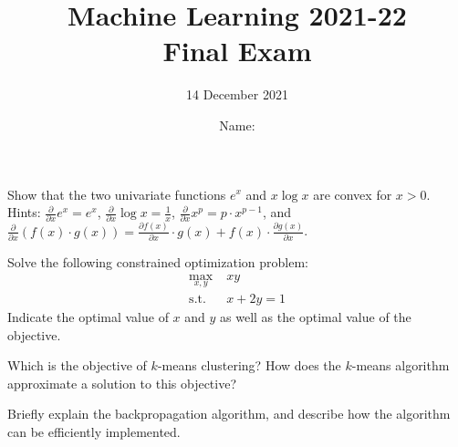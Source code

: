 \documentclass[11pt]{article}
\title{
\vspace{-1.2cm}
Machine Learning 2021-22\\ Final Exam}
\author{14 December 2021}
\date{Name: \dotfill}%
\newcounter{marks}
\begin{document}
\maketitle


\begin{list}{{\bf Question :}}
	{
	}

\item
{}
\addtocounter{marks}{2}
Show that the two univariate functions $e^x$ and $x\log x$ are convex for $x>0$.\\
Hints: $\frac \partial {\partial x} e^x = e^x$, $\frac \partial {\partial x} \log x = \frac 1 x$, $\frac \partial {\partial x} x^p = p \cdot x^{p-1}$, and $\frac \partial {\partial x} \left( f(x) \cdot g(x) \right) = \frac {\partial f(x)} {\partial x} \cdot g(x) + f(x) \cdot\frac {\partial g(x)} {\partial x}$.

\framebox[16cm][l]{ 
\parbox{15.9cm}{
\vspace*{7cm}
}}

\item
{}
\addtocounter{marks}{2}
Solve the following constrained optimization problem:
  \begin{align*}
	\max_{x,y} \; & xy\\
	\mathrm{s.t.} \; & x + 2y = 1
  \end{align*}
  Indicate the optimal value of $x$ and $y$ as well as the optimal value of the objective.

\framebox[16cm][l]{ 
\parbox{15.9cm}{
\vspace*{7cm}
}}

\pagebreak



\item
{}
\addtocounter{marks}{1}
Which is the objective of $k$-means clustering? How does the $k$-means algorithm approximate a solution to this objective?

\framebox[16cm][l]{ 
\parbox{15.9cm}{
\vspace*{6.5cm}
}}

\item
{}
\addtocounter{marks}{1}
Briefly explain the backpropagation algorithm, and describe how the algorithm can be efficiently implemented.

\framebox[16cm][l]{
\parbox{15.9cm}{
\vspace*{6.5cm}
}}


\end{list}
\end{document}
